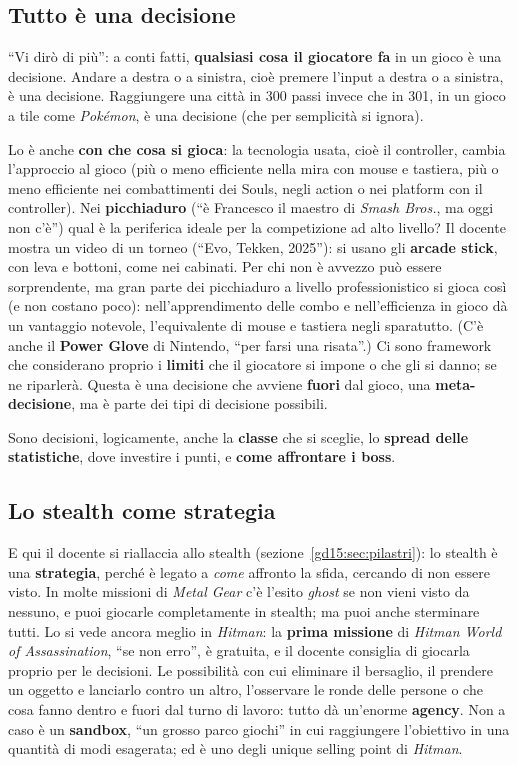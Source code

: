 \subsection{Tutto è una decisione}

``Vi dirò di più'': a conti fatti, \textbf{qualsiasi cosa il giocatore fa}
in un gioco è una decisione. Andare a destra o a sinistra, cioè premere
l'input a destra o a sinistra, è una decisione. Raggiungere una città in
300 passi invece che in 301, in un gioco a tile come \emph{Pokémon}, è una
decisione (che per semplicità si ignora).

Lo è anche \textbf{con che cosa si gioca}: la tecnologia usata, cioè il
controller, cambia l'approccio al gioco (più o meno efficiente nella mira con
mouse e tastiera, più o meno efficiente nei combattimenti dei Souls,
negli action o nei platform con il controller). Nei \textbf{picchiaduro} (``è
Francesco il maestro di \emph{Smash Bros.}, ma oggi non c'è'') qual è la
periferica ideale per la competizione ad alto livello? Il docente mostra un
video di un torneo (``Evo, Tekken, 2025''): si usano gli \textbf{arcade
stick}, con leva e bottoni, come nei cabinati. Per chi non è avvezzo può
essere sorprendente, ma gran parte dei picchiaduro a livello professionistico
si gioca così (e non costano poco): nell'apprendimento delle combo e
nell'efficienza in gioco dà un vantaggio notevole, l'equivalente di mouse e
tastiera negli sparatutto. (C'è anche il \textbf{Power Glove} di Nintendo,
``per farsi una risata''.) Ci sono framework che considerano proprio i
\textbf{limiti} che il giocatore si impone o che gli si danno; se ne
riparlerà. Questa è una decisione che avviene \textbf{fuori} dal gioco, una
\textbf{meta-decisione}, ma è parte dei tipi di decisione possibili.

Sono decisioni, logicamente, anche la \textbf{classe} che si sceglie, lo
\textbf{spread delle statistiche}, dove investire i punti, e \textbf{come
affrontare i boss}.

\subsection{Lo stealth come strategia}

E qui il docente si riallaccia allo stealth
(sezione~\ref{gd15:sec:pilastri}): lo stealth è una \textbf{strategia},
perché è legato a \emph{come} affronto la sfida, cercando di non essere
visto. In molte missioni di \emph{Metal Gear} c'è l'esito \emph{ghost} se
non vieni visto da nessuno, e puoi giocarle completamente in stealth; ma
puoi anche sterminare tutti. Lo si vede ancora meglio in \emph{Hitman}: la
\textbf{prima missione} di \emph{Hitman World of Assassination}, ``se non
erro'', è gratuita, e il docente consiglia di giocarla proprio per le
decisioni. Le possibilità con cui eliminare il bersaglio, il prendere un
oggetto e lanciarlo contro un altro, l'osservare le ronde delle persone o
che cosa fanno dentro e fuori dal turno di lavoro: tutto dà un'enorme
\textbf{agency}. Non a caso è un \textbf{sandbox}, ``un grosso parco giochi''
in cui raggiungere l'obiettivo in una quantità di modi esagerata; ed è uno
degli unique selling point di \emph{Hitman}.

